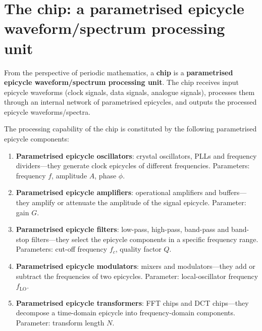 \section{The chip: a parametrised epicycle waveform/spectrum processing unit}

\begin{definition}\label{def:chip_epicycle_model}
From the perspective of periodic mathematics, a \textbf{chip} is a \textbf{parametrised epicycle waveform/spectrum processing unit}. The chip receives input epicycle waveforms (clock signals, data signals, analogue signals), processes them through an internal network of parametrised epicycles, and outputs the processed epicycle waveforms/spectra.

The processing capability of the chip is constituted by the following parametrised epicycle components:
\begin{enumerate}[label=(\roman*)]
    \item \textbf{Parametrised epicycle oscillators}: crystal oscillators, PLLs and frequency dividers---they generate clock epicycles of different frequencies. Parameters: frequency $f$, amplitude $A$, phase $\phi$.
    \item \textbf{Parametrised epicycle amplifiers}: operational amplifiers and buffers---they amplify or attenuate the amplitude of the signal epicycle. Parameter: gain $G$.
    \item \textbf{Parametrised epicycle filters}: low-pass, high-pass, band-pass and band-stop filters---they select the epicycle components in a specific frequency range. Parameters: cut-off frequency $f_c$, quality factor $Q$.
    \item \textbf{Parametrised epicycle modulators}: mixers and modulators---they add or subtract the frequencies of two epicycles. Parameter: local-oscillator frequency $f_{\text{LO}}$.
    \item \textbf{Parametrised epicycle transformers}: FFT chips and DCT chips---they decompose a time-domain epicycle into frequency-domain components. Parameter: transform length $N$.
\end{enumerate}
\end{definition}

